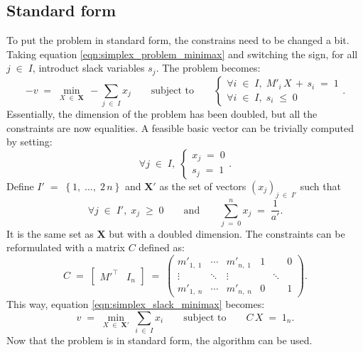 \documentclass{report}
\theoremstyle{definition}
\theoremstyle{plain}
\begin{document}
\subsection{Standard form}
To put the problem in standard form, the constrains need to be changed a bit.
Taking equation \ref{eqn:simplex_problem_minimax} and switching the sign, for
all $j\;\in\;I$, introduct slack variables $s_j$. The problem becomes:
\begin{equation}
	-v\;=\;\min_{X\;\in\;\mathbf X}\,-\sum_{j\;\in\;I}x_j
		\qquad\text{subject to}\qquad
		\begin{cases}
		\forall i\;\in\;I,\;M'_i\,X\,+\,s_i\;=\;1\\
		\forall i\;\in\;I,\;s_i\;\leqslant\;0
		\end{cases}.
	\label{eqn:simplex_slack_minimax}
\end{equation}
Essentially, the dimension of the problem has been doubled, but all the
constraints are now equalities. A feasible basic vector can be trivially
computed by setting:
\[ \forall j\;\in\;I,\;\begin{cases} x_j\;=\;0 \\ s_j\;=\;1 \end{cases}. \]
Define $I'\;=\;\left\{1,\;\ldots,\;2\,n\right\}$ and $\mathbf X'$ as the set of
vectors $\left(x_j\right)_{j\;\in\;I'}$ such that \[
	\forall j\;\in\;I',\;x_j\;\geqslant\;0
		\qquad\text{and}\qquad \sum_{j\;=\;0}^nx_j\;=\;\frac1{a'}.
\]
It is the same set as $\mathbf X$ but with a doubled dimension. The constraints
can be reformulated with a matrix $C$ defined as: \[
	C\;=\;\left[\begin{array}{c|c}M'^\top & I_n\end{array}\right]
	 \;=\;\begin{pmatrix}
		m'_{1,\;1} & \cdots & m'_{n,\;1} & 1 & & 0 \\
		\vdots & \ddots & \vdots & & \ddots & \\
		m'_{1,\;n} & \cdots & m'_{n,\;n} & 0 & & 1
	\end{pmatrix}.
\]
This way, equation \ref{eqn:simplex_slack_minimax} becomes:
\begin{equation}
	v\;=\;\min_{X\;\in\;\mathbf X'}\,\sum_{i\;\in\;I}x_i
		\qquad\text{subject to}\qquad
		C\,X\;=\;1_n.
	\label{eqn:simplex_standard_form}
\end{equation}
Now that the problem is in standard form, the algorithm can be used.

\end{document}
